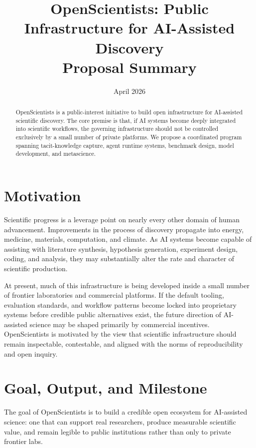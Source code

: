 \documentclass[11pt]{article}
\title{\textbf{OpenScientists: Public Infrastructure for AI-Assisted Discovery}\\[0.4em]
\large Proposal Summary}
\author{}
\date{April 2026}
\begin{document}
\maketitle

\begin{abstract}
OpenScientists is a public-interest initiative to build open infrastructure for AI-assisted scientific discovery. The core premise is that, if AI systems become deeply integrated into scientific workflows, the governing infrastructure should not be controlled exclusively by a small number of private platforms. We propose a coordinated program spanning tacit-knowledge capture, agent runtime systems, benchmark design, model development, and metascience.
\end{abstract}

\section{Motivation}
Scientific progress is a leverage point on nearly every other domain of human advancement. Improvements in the process of discovery propagate into energy, medicine, materials, computation, and climate. As AI systems become capable of assisting with literature synthesis, hypothesis generation, experiment design, coding, and analysis, they may substantially alter the rate and character of scientific production.

At present, much of this infrastructure is being developed inside a small number of frontier laboratories and commercial platforms. If the default tooling, evaluation standards, and workflow patterns become locked into proprietary systems before credible public alternatives exist, the future direction of AI-assisted science may be shaped primarily by commercial incentives. OpenScientists is motivated by the view that scientific infrastructure should remain inspectable, contestable, and aligned with the norms of reproducibility and open inquiry.

\section{Goal, Output, and Milestone}
The goal of OpenScientists is to build a credible open ecosystem for AI-assisted science: one that can support real researchers, produce measurable scientific value, and remain legible to public institutions rather than only to private frontier labs.
\end{document}
